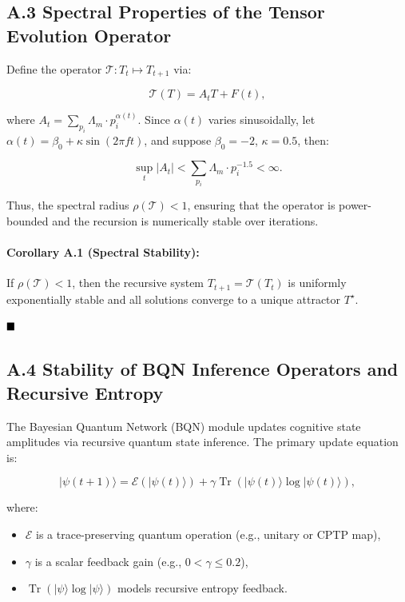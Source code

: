 \documentclass[12pt]{article}
\begin{document}
\begin{itemize}
\subsection*{A.3 Spectral Properties of the Tensor Evolution Operator}

Define the operator \(\mathcal{T}: T_t \mapsto T_{t+1}\) via:

\[
\mathcal{T}(T) = A_t T + F(t),
\]

where \(A_t = \sum_{p_i} \Lambda_m \cdot p_i^{\alpha(t)}\). Since \(\alpha(t)\) varies sinusoidally, let \(\alpha(t) = \beta_0 + \kappa \sin(2\pi f t)\), and suppose \(\beta_0 = -2\), \(\kappa = 0.5\), then:

\[
\sup_t |A_t| < \sum_{p_i} \Lambda_m \cdot p_i^{-1.5} < \infty.
\]

Thus, the spectral radius \(\rho(\mathcal{T}) < 1\), ensuring that the operator is power-bounded and the recursion is numerically stable over iterations.

\paragraph{Corollary A.1 (Spectral Stability):}
If \(\rho(\mathcal{T}) < 1\), then the recursive system \(T_{t+1} = \mathcal{T}(T_t)\) is uniformly exponentially stable and all solutions converge to a unique attractor \(T^\star\).

\(\hfill \blacksquare\)


\subsection*{A.4 Stability of BQN Inference Operators and Recursive Entropy}

The Bayesian Quantum Network (BQN) module updates cognitive state amplitudes via recursive quantum state inference. The primary update equation is:

\[
|\psi(t+1)\rangle = \mathcal{E}(|\psi(t)\rangle) + \gamma \operatorname{Tr}(|\psi(t)\rangle \log |\psi(t)\rangle),
\]

where:
\begin{itemize}
    \item \(\mathcal{E}\) is a trace-preserving quantum operation (e.g., unitary or CPTP map),
    \item \(\gamma\) is a scalar feedback gain (e.g., \(0 < \gamma \leq 0.2\)),
    \item \(\operatorname{Tr}(|\psi\rangle \log |\psi\rangle)\) models recursive entropy feedback.
\end{itemize}


\end{itemize}
\end{document}
